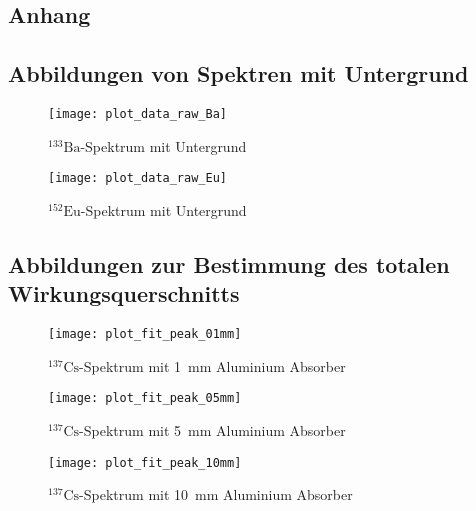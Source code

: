 \documentclass[11pt, ngerman, fleqn, DIV=15, headinclude, BCOR=2cm]{scrreprt}
\begin{document}
\begin{appendix}

\chapter{Anhang}

\section{Abbildungen von Spektren mit Untergrund}\label{anhang-rohspektren-energiekalibrierung}
\begin{figure}[h]
    \centering
    \texttt{[image: plot\_data\_raw\_Ba]}
    \caption{%
	    $^{133}\text{Ba}$-Spektrum mit Untergrund
    }
    \label{fig:plot_data_raw_Ba}
\end{figure}

\begin{figure}[h]
    \centering
    \texttt{[image: plot\_data\_raw\_Eu]}
    \caption{%
	    $^{152}\text{Eu}$-Spektrum mit Untergrund
   }
    \label{fig:plot_data_raw_Eu}
\end{figure}

\clearpage

\section{Abbildungen zur Bestimmung des totalen Wirkungsquerschnitts} \label{anhang-wirkungsquerschnitt}
\begin{figure}[h]
    \centering
    \texttt{[image: plot\_fit\_peak\_01mm]}
    \caption{%
	    $^{137}\text{Cs}$-Spektrum mit \SI{1}{\milli\metre} Aluminium
	    Absorber
    }
    \label{fig:plot_fit_peak_01mm}
\end{figure}

\begin{figure}[h]
    \centering
    \texttt{[image: plot\_fit\_peak\_05mm]}
    \caption{%
	    $^{137}\text{Cs}$-Spektrum mit \SI{5}{\milli\metre} Aluminium
	    Absorber
   }
    \label{fig:plot_fit_peak_05mm}
\end{figure}

\begin{figure}[h]
    \centering
    \texttt{[image: plot\_fit\_peak\_10mm]}
    \caption{%
	    $^{137}\text{Cs}$-Spektrum mit \SI{10}{\milli\metre} Aluminium
	    Absorber
   }
    \label{fig:plot_fit_peak_10mm}
\end{figure}


\end{appendix}
\end{document}

